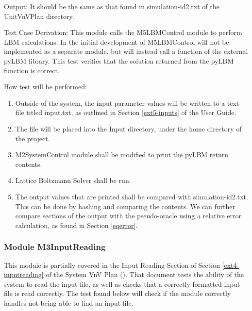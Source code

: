 \documentclass[12pt, titlepage]{article}
\newcommand{\myprogname}{Lattice Boltzmann Solver}
\begin{document}
\begin{enumerate}
	Output: It should be the same as that found in simulation-id2.txt of the UnitVnVPlan directory.
	
	Test Case Derivation: This module calls the M5LBMControl module to perform LBM calculations. In the initial development of {\progname} M5LBMControl will not be implemented as a separate module, but will instead call a function of the external pyLBM library. This test verifies that the solution returned from the pyLBM function is correct.
	
	How test will be performed: 
	\begin{enumerate}
		\item Outside of the system, the input parameter values will be written to a text file titled input.txt, as outlined in Section \ref{ext5-inputs} of the User Guide.
		\item The file will be placed into the Input directory, under the home directory of the project.
		\item M2SystemControl module shall be modified to print the pyLBM return contents.
		\item {\myprogname} shall be run. 
		\item The output values that are printed shall be compared with simulation-id2.txt. This can be done by hashing and comparing the contents. We can further compare sections of the output with the pseudo-oracle using a relative error calculation, as found in Section \ref{eqerror}.
	\end{enumerate}
	
\end{enumerate}

\subsubsection{Module M3InputReading}
\label{inreading}

This module is partially covered in the Input Reading Section of Section \ref{ext4-inputreading} of the System VnV Plan (\citet{LBM_SVNV_PM}). That document tests the ability of the system to read the input file, as well as checks that a correctly formatted input file is read correctly. The test found below will check if the module correctly handles not being able to find an input file.
\end{document}
